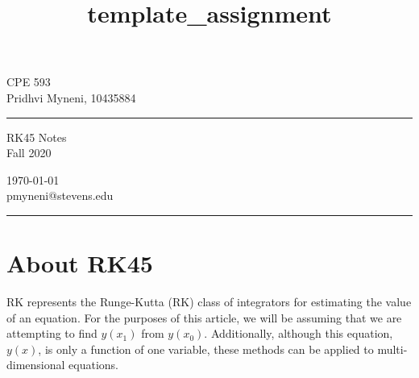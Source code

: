 \documentclass[letterpaper,12pt]{article} %
\begin{document}


\title{template_assignment} %
\fancyhead[C]{}
\begin{minipage}{0.295\textwidth} %
    \raggedright
    CPE 593\\ %
    \footnotesize %
    Pridhvi Myneni, 10435884 %
    \medskip\hrule
\end{minipage}
\begin{minipage}{0.4\textwidth} %
    \centering
    \large %
    RK45 Notes\\ %
    \normalsize %
    Fall 2020\\ %
\end{minipage}
\begin{minipage}{0.295\textwidth} %
    \raggedleft
    \today\\ %
    \footnotesize %
    pmyneni@stevens.edu%
    \medskip\hrule
\end{minipage}


\tableofcontents
\section{About RK45}
\newcommand{\target}[0]{{\int_{x_0}}^{x_1}(y(x))dx}
\renewcommand{\target}[0]{y(x_1)}
\newcommand{\currentEquation}[1]{(#1-3)^5 + (#1-3)^4 + (#1-3)^3 + (#1-3)^2}
\newcommand{\currEq}[0]{\currentEquation{x}}
RK represents the Runge-Kutta (RK) class of integrators for estimating the value of an equation.
For the purposes of this article, we will be assuming that we are attempting to find \(y(x_1)\) from \(y(x_0)\).
Additionally, although this equation, \(y(x)\), is only a function of one variable, these methods can be applied to multi-dimensional equations.
\end{document}
